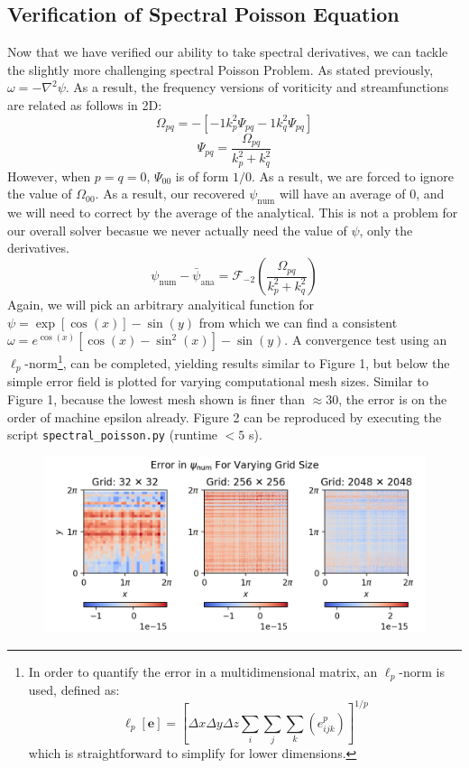 \documentclass[12pt, reqno]{amsart}
\begin{document}
\subsection{Verification of Spectral Poisson Equation}
Now that we have verified our ability to take spectral derivatives, we can tackle the slightly more challenging spectral Poisson Problem. As stated previously, $\omega = - \nabla^2 \psi$. As a result, the frequency versions of voriticity and streamfunctions are related as follows in 2D:
\begin{equation}
    \Omega_{pq} = - \left[ -1 k_p^2 \Psi_{pq} - 1 k_q^2 \Psi_{pq} \right]
\end{equation}
\begin{equation}
    \Psi_{pq} = \frac{\Omega_{pq}}{k_p^2 + k_q^2}
\end{equation}
However, when $p = q = 0$, $\Psi_{00}$ is of form $1/0$. As a result, we are forced to ignore the value of $\Omega_{00}$. As a result, our recovered $\psi_\mathrm{num}$ will have an average of 0, and we will need to correct by the average of the analytical. This is not a problem for our overall solver becasue we never actually need the value of $\psi$, only the derivatives.
\begin{equation}
    \psi_\mathrm{num} - \bar{\psi}_\mathrm{ana} = \mathcal{F}_{-2} \left( \frac{\Omega_{pq}}{k_p^2 + k_q^2} \right)
\end{equation}
Again, we will pick an arbitrary analyitical function for $\psi = \exp[ \cos(x) ] - \sin(y)$ from which we can find a consistent $\omega = e^{\cos(x)} \left[ \cos(x) - \sin^2(x) \right] - \sin(y)$. A convergence test using an $\ell_p$-norm\footnote{In order to quantify the error in a multidimensional matrix, an $\ell_p$-norm is used, defined as: \[ \ell_p [\mathbf{e}] = \left[ \Delta x \Delta y \Delta z \sum_i \sum_j \sum_k \left( e_{ijk}^p \right) \right]^{1/p} \]which is straightforward to simplify for lower dimensions.}, can be completed, yielding results similar to Figure 1, but below the simple error field is plotted for varying computational mesh sizes. Similar to Figure 1, because the lowest mesh shown is finer than $\approx 30$, the error is on the order of machine epsilon already. Figure 2 can be reproduced by executing the script \texttt{spectral\_poisson.py} (runtime $<5$ s).

\begin{figure}[H]
    \centering
    \includegraphics[width = 1\linewidth]{spectral_poisson.png}
\end{figure}
\end{document}
